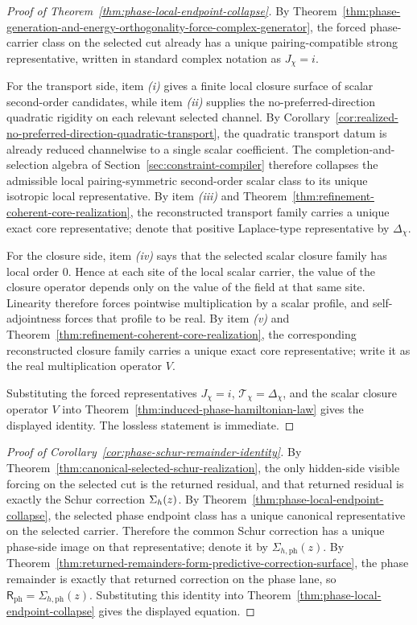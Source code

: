 \begin{proof}[Proof of Theorem~\ref{thm:phase-local-endpoint-collapse}]
\label{proof:thm:phase-local-endpoint-collapse}
By
Theorem~\ref{thm:phase-generation-and-energy-orthogonality-force-complex-generator},
the forced phase-carrier class on the selected cut already has a unique
pairing-compatible strong representative, written in standard complex notation
as \(J_{\chi}=i\).

For the transport side, item \emph{(i)} gives a finite local closure surface
of scalar second-order candidates, while item \emph{(ii)} supplies the
no-preferred-direction quadratic rigidity on each relevant selected channel.
By Corollary~\ref{cor:realized-no-preferred-direction-quadratic-transport}, the
quadratic transport datum is already reduced channelwise to a single scalar
coefficient. The completion-and-selection algebra of
Section~\ref{sec:constraint-compiler} therefore collapses the admissible local
pairing-symmetric second-order scalar class to its unique isotropic local
representative. By item \emph{(iii)} and
Theorem~\ref{thm:refinement-coherent-core-realization}, the reconstructed
transport family carries a unique exact core representative; denote that
positive
Laplace-type representative by \(\Delta_{\chi}\).

For the closure side, item \emph{(iv)} says that the selected scalar closure
family has local order \(0\). Hence at each site of the local scalar carrier,
the value of the closure operator depends only on the value of the field at
that same site. Linearity therefore forces pointwise multiplication by a scalar
profile, and self-adjointness forces that profile to be real. By item
\emph{(v)} and Theorem~\ref{thm:refinement-coherent-core-realization}, the
corresponding reconstructed closure family carries a unique exact core
representative; write it as the real multiplication operator \(V\).

Substituting the forced representatives \(J_{\chi}=i\),
\(\mathcal T_{\chi}=\Delta_{\chi}\), and the scalar closure operator \(V\) into
Theorem~\ref{thm:induced-phase-hamiltonian-law} gives the displayed identity.
The lossless statement is immediate.
\end{proof}

\begin{proof}[Proof of Corollary~\ref{cor:phase-schur-remainder-identity}]
\label{proof:cor:phase-schur-remainder-identity}
By Theorem~\ref{thm:canonical-selected-schur-realization}, the only hidden-side
visible forcing on the selected cut is the returned residual, and that
returned residual is exactly the Schur correction \(\Sigma_{h}(z)\). By
Theorem~\ref{thm:phase-local-endpoint-collapse}, the selected phase endpoint
class has a unique canonical representative on the selected carrier. Therefore
the common Schur correction has a unique phase-side image on that
representative; denote it by \(\Sigma_{h,\mathrm{ph}}(z)\). By
Theorem~\ref{thm:returned-remainders-form-predictive-correction-surface}, the
phase remainder is exactly that returned correction on the phase lane, so
\(\mathsf R_{\mathrm{ph}}=\Sigma_{h,\mathrm{ph}}(z)\). Substituting this
identity into Theorem~\ref{thm:phase-local-endpoint-collapse} gives the
displayed equation.
\end{proof}

